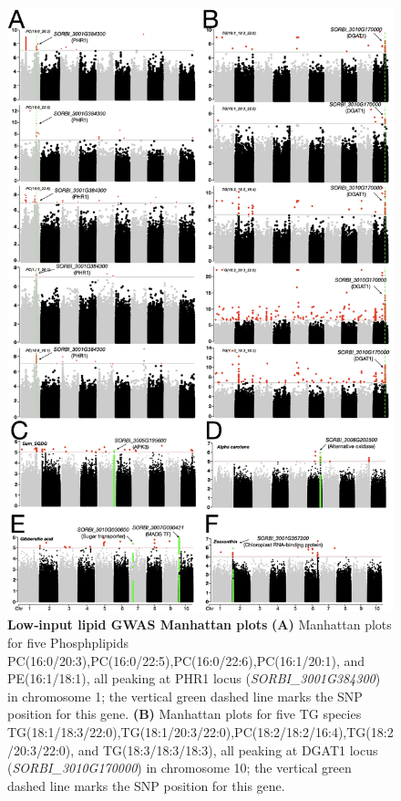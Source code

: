 \documentclass[10pt,letterpaper]{article}
\begin{document}
\begin{itemize}
\begin{figure}[htbp]
  \centering
  \includegraphics[width=\textwidth]{fig/main/Fig3.png}
  \caption{\textbf{Low‐input lipid GWAS Manhattan plots}
    \textbf{(A)} Manhattan plots for five Phosphplipids PC(16:0/20:3),PC(16:0/22:5),PC(16:0/22:6),PC(16:1/20:1), and PE(16:1/18:1), all peaking at PHR1 locus (\textit{SORBI\_3001G384300}) in chromosome 1; the vertical green dashed line marks the SNP position for this gene.  
    \textbf{(B)} Manhattan plots for five TG species TG(18:1/18:3/22:0),TG(18:1/20:3/22:0),PC(18:2/18:2/16:4),TG(18:2/20:3/22:0), and TG(18:3/18:3/18:3), all peaking at DGAT1 locus (\textit{SORBI\_3010G170000}) in chromosome 10; the vertical green dashed line marks the SNP position for this gene. 
}
\end{figure}
\end{itemize}
\end{document}
